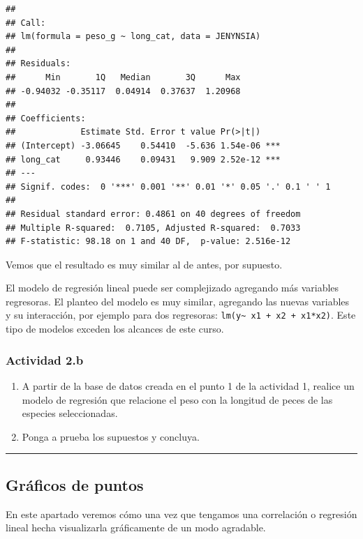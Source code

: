 \documentclass[
]{article}
\providecommand{\tightlist}{%
  \setlength{\itemsep}{0pt}\setlength{\parskip}{0pt}}
\begin{document}
\begin{verbatim}
## 
## Call:
## lm(formula = peso_g ~ long_cat, data = JENYNSIA)
## 
## Residuals:
##      Min       1Q   Median       3Q      Max 
## -0.94032 -0.35117  0.04914  0.37637  1.20968 
## 
## Coefficients:
##             Estimate Std. Error t value Pr(>|t|)    
## (Intercept) -3.06645    0.54410  -5.636 1.54e-06 ***
## long_cat     0.93446    0.09431   9.909 2.52e-12 ***
## ---
## Signif. codes:  0 '***' 0.001 '**' 0.01 '*' 0.05 '.' 0.1 ' ' 1
## 
## Residual standard error: 0.4861 on 40 degrees of freedom
## Multiple R-squared:  0.7105, Adjusted R-squared:  0.7033 
## F-statistic: 98.18 on 1 and 40 DF,  p-value: 2.516e-12
\end{verbatim}

Vemos que el resultado es muy similar al de antes, por supuesto.

El modelo de regresión lineal puede ser complejizado agregando más
variables regresoras. El planteo del modelo es muy similar, agregando
las nuevas variables y su interacción, por ejemplo para dos regresoras:
\texttt{lm(y\textasciitilde{}\ x1\ +\ x2\ +\ x1*x2)}. Este tipo de
modelos exceden los alcances de este curso.

\subsubsection{Actividad 2.b}\label{actividad-2.b}

\begin{enumerate}
\def\labelenumi{\arabic{enumi}.}
\tightlist
\item
  A partir de la base de datos creada en el punto 1 de la actividad 1,
  realice un modelo de regresión que relacione el peso con la longitud
  de peces de las especies seleccionadas.
\item
  Ponga a prueba los supuestos y concluya.
\end{enumerate}

\begin{center}\rule{0.5\linewidth}{0.5pt}\end{center}

\subsection{Gráficos de puntos}\label{gruxe1ficos-de-puntos}

En este apartado veremos cómo una vez que tengamos una correlación o
regresión lineal hecha visualizarla gráficamente de un modo agradable.
\end{document}
